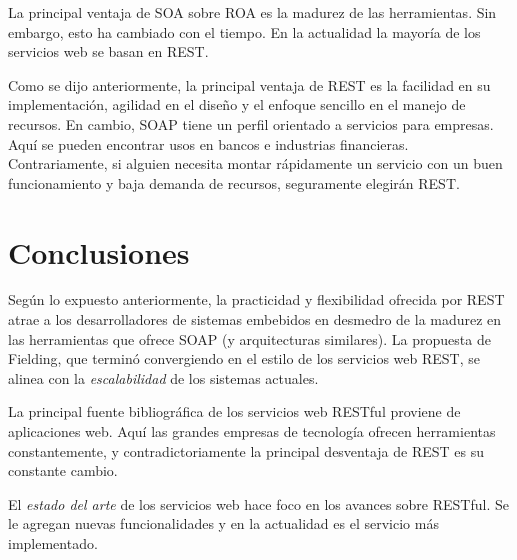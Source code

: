 \documentclass[conference]{IEEEtran}
\begin{document}
La principal ventaja de SOA sobre ROA es la madurez de las
herramientas. Sin embargo, esto ha cambiado con el tiempo. En la
actualidad la mayoría de los servicios web se basan en REST.

Como se dijo anteriormente, la principal ventaja de REST es la
facilidad en su implementación, agilidad en el diseño y el enfoque
sencillo en el manejo de recursos. En cambio, SOAP tiene un perfil
orientado a servicios para empresas. Aquí se pueden encontrar usos en
bancos e industrias financieras. Contrariamente, si alguien necesita
montar rápidamente un servicio con un buen funcionamiento y baja
demanda de recursos, seguramente elegirán REST.

\section{Conclusiones}
\label{sec:con}

Según lo expuesto anteriormente, la practicidad y flexibilidad
ofrecida por REST atrae a los desarrolladores de sistemas embebidos en
desmedro de la madurez en las herramientas que ofrece SOAP (y
arquitecturas similares). La propuesta de Fielding, que terminó
convergiendo en el estilo de los servicios web REST, se alinea con la
\emph{escalabilidad} de los sistemas actuales.

La principal fuente bibliográfica de los servicios web RESTful
proviene de aplicaciones web. Aquí las grandes empresas de
tecnología ofrecen herramientas constantemente, y contradictoriamente
la principal desventaja de REST es su constante cambio. 

El \emph{estado del arte} de los servicios web hace foco en los avances
sobre RESTful. Se le agregan nuevas funcionalidades y en la actualidad
es el servicio más implementado. 
\end{document}
